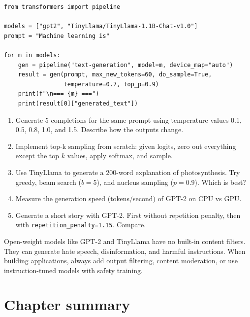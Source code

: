 \begin{verbatim}
from transformers import pipeline

models = ["gpt2", "TinyLlama/TinyLlama-1.1B-Chat-v1.0"]
prompt = "Machine learning is"

for m in models:
    gen = pipeline("text-generation", model=m, device_map="auto")
    result = gen(prompt, max_new_tokens=60, do_sample=True,
                 temperature=0.7, top_p=0.9)
    print(f"\n=== {m} ===")
    print(result[0]["generated_text"])
\end{verbatim}

\begin{exercise}
\begin{enumerate}
  \item Generate 5 completions for the same prompt using temperature values 0.1, 0.5, 0.8, 1.0, and 1.5. Describe how the outputs change.
  \item Implement top-k sampling from scratch: given logits, zero out everything except the top $k$ values, apply softmax, and sample.
  \item Use TinyLlama to generate a 200-word explanation of photosynthesis. Try greedy, beam search ($b=5$), and nucleus sampling ($p=0.9$). Which is best?
  \item Measure the generation speed (tokens/second) of GPT-2 on CPU vs GPU.
  \item Generate a short story with GPT-2. First without repetition penalty, then with \texttt{repetition\_penalty=1.15}. Compare.
\end{enumerate}
\end{exercise}

\begin{ethicsbox}
Open-weight models like GPT-2 and TinyLlama have no built-in content filters. They can generate hate speech, disinformation, and harmful instructions. When building applications, always add output filtering, content moderation, or use instruction-tuned models with safety training.
\end{ethicsbox}

\section{Chapter summary}

